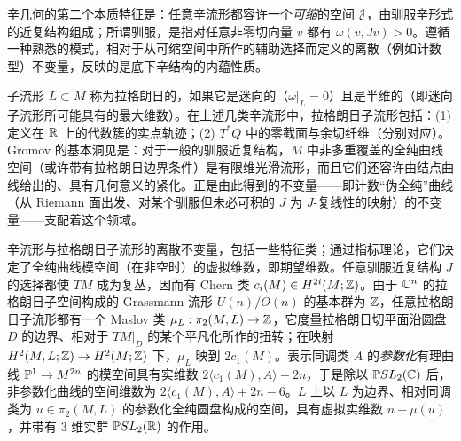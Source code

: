 
辛几何的第二个本质特征是：任意辛流形都容许一个\emph{可缩}的空间 $\EuScript{J}$，由驯服辛形式的近复结构组成；所谓驯服，是指对任意非零切向量 $v$ 都有 $\omega(v, Jv) > 0$。遵循一种熟悉的模式，相对于从可缩空间中所作的辅助选择而定义的离散（例如计数型）不变量，反映的是底下辛结构的内蕴性质。


子流形 $L\subset M$ 称为拉格朗日的，如果它是迷向的（$\omega|_L = 0$）且是半维的（即迷向子流形所可能具有的最大维数）。在上述几类辛流形中，拉格朗日子流形包括：(1) 定义在 $\mathbb{R}$ 上的代数簇的实点轨迹；(2) $T^*Q$ 中的零截面与余切纤维（分别对应）。Gromov 的基本洞见是：对于一般的驯服近复结构，$M$ 中非多重覆盖的全纯曲线空间（或许带有拉格朗日边界条件）是有限维光滑流形，而且它们还容许由结点曲线给出的、具有几何意义的紧化。正是由此得到的不变量——即计数“伪全纯”曲线（从 Riemann 面出发、对某个驯服但未必可积的 $J$ 为 $J$-复线性的映射）的不变量——支配着这个领域。


辛流形与拉格朗日子流形的离散不变量，包括一些特征类；通过指标理论，它们决定了全纯曲线模空间（在非空时）的虚拟维数，即期望维数。任意驯服近复结构 $J$ 的选择都使 $TM$ 成为复丛，因而有 Chern 类 $c_i(M) \in H^{2i}(M;\mathbb{Z})$。由于 $\mathbb{C}^n$ 的拉格朗日子空间构成的 Grassmann 流形 $U(n) / O(n)$ 的基本群为 $\mathbb{Z}$，任意拉格朗日子流形都有一个 Maslov 类 $\mu_L: \pi_2(M,L) \rightarrow \mathbb{Z}$，它度量拉格朗日切平面沿圆盘 $D$ 的边界、相对于 $TM|_D$ 的某个平凡化所作的扭转；在映射 $H^2(M,L;\mathbb{Z}) \rightarrow H^2(M;\mathbb{Z})$ 下，$\mu_L$ 映到 $2c_1(M)$。表示同调类 $A$ 的\emph{参数化}有理曲线 $\mathbb{P}^1 \rightarrow M^{2n}$ 的模空间具有实维数 $2\langle c_1(M),A\rangle + 2n$，于是除以 $\mathbb{P} SL_2(\mathbb{C})$ 后，非参数化曲线的空间维数为 $2\langle c_1(M), A\rangle + 2n - 6$。$L$ 上以 $L$ 为边界、相对同调类为 $u \in \pi_2(M,L)$ 的参数化全纯圆盘构成的空间，具有虚拟实维数 $n + \mu(u)$，并带有 3 维实群 $\mathbb{P} SL_2(\mathbb{R})$ 的作用。

